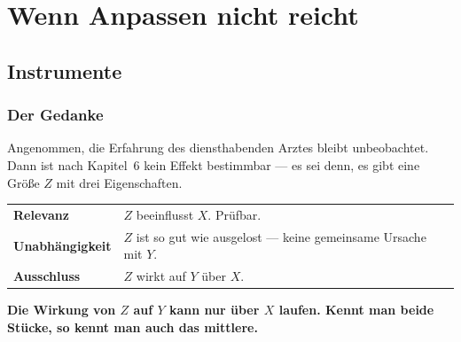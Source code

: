 \part{Wenn Anpassen nicht reicht}

\chapter{Instrumente}

\section{Der Gedanke}

\begin{merksatz}
Angenommen, die Erfahrung des diensthabenden Arztes bleibt unbeobachtet. Dann ist nach Kapitel~6 kein Effekt bestimmbar --- es sei denn, es gibt eine Größe $Z$ mit drei Eigenschaften.

\begin{center}
{\small
\renewcommand{\arraystretch}{1.55}
\begin{tabular}{@{}P{2.8cm}P{5.8cm}@{}}
\toprule
\textbf{Relevanz} & $Z$ beeinflusst $X$. \textcolor{gruen}{Prüfbar.}\\
\textbf{Unabhängigkeit} & $Z$ ist so gut wie ausgelost --- keine gemeinsame Ursache mit $Y$.\\
\textbf{Ausschluss} & $Z$ wirkt auf $Y$  über $X$.\\
\bottomrule
\end{tabular}}
\end{center}

\begin{center}
\end{center}

\begin{center}
\begin{minipage}{0.9\textwidth}
\textbf{Die Wirkung von $Z$ auf $Y$ kann nur über $X$ laufen. Kennt man beide Stücke, so kennt man auch das mittlere.}
\end{minipage}
\end{center}
\end{merksatz}

